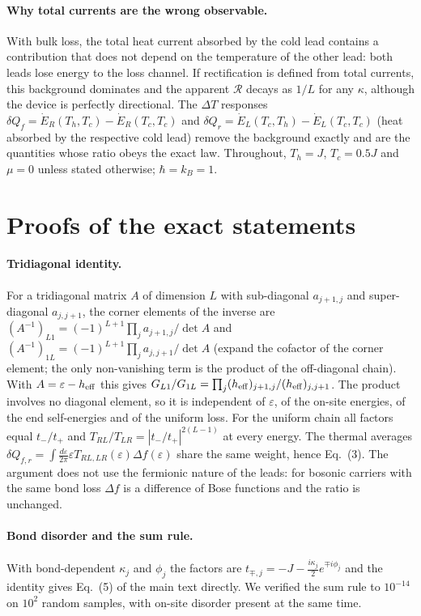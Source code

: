 \documentclass[reprint,aps,prl,superscriptaddress,nofootinbib,floatfix]{revtex4-2}
\newcommand{\R}{\mathcal{R}}
\newcommand{\dQ}{\delta Q}
\newcommand{\heff}{h_{\rm eff}}
\begin{document}
\paragraph{Why total currents are the wrong observable.}
With bulk loss, the total heat current absorbed by the cold lead contains a contribution that does not depend on the temperature of the other lead: both leads lose energy to the loss channel. If rectification is defined from total currents, this background dominates and the apparent $\R$ decays as $1/L$ for any $\kappa$, although the device is perfectly directional. The $\Delta T$ responses $\dQ_{f}=\dot E_R(T_h,T_c)-\dot E_R(T_c,T_c)$ and $\dQ_r=\dot E_L(T_c,T_h)-\dot E_L(T_c,T_c)$ (heat absorbed by the respective cold lead) remove the background exactly and are the quantities whose ratio obeys the exact law. Throughout, $T_h=J$, $T_c=0.5J$ and $\mu=0$ unless stated otherwise; $\hbar=k_B=1$.

\section{Proofs of the exact statements}
\label{sec:proofs}

\paragraph{Tridiagonal identity.}
For a tridiagonal matrix $A$ of dimension $L$ with sub-diagonal $a_{j+1,j}$ and super-diagonal $a_{j,j+1}$, the corner elements of the inverse are $(A^{-1})_{L1}=(-1)^{L+1}\prod_{j}a_{j+1,j}/\det A$ and $(A^{-1})_{1L}=(-1)^{L+1}\prod_j a_{j,j+1}/\det A$ (expand the cofactor of the corner element; the only non-vanishing term is the product of the off-diagonal chain). With $A=\varepsilon-\heff$ this gives $G_{L1}/G_{1L}=\prod_j(\heff)_{j+1,j}/(\heff)_{j,j+1}$. The product involves no diagonal element, so it is independent of $\varepsilon$, of the on-site energies, of the end self-energies and of the uniform loss. For the uniform chain all factors equal $t_-/t_+$ and $T_{RL}/T_{LR}=|t_-/t_+|^{2(L-1)}$ at every energy. The thermal averages $\dQ_{f,r}=\int\frac{d\varepsilon}{2\pi}\varepsilon T_{RL,LR}(\varepsilon)\Delta f(\varepsilon)$ share the same weight, hence Eq.~(3). The argument does not use the fermionic nature of the leads: for bosonic carriers with the same bond loss $\Delta f$ is a difference of Bose functions and the ratio is unchanged.

\paragraph{Bond disorder and the sum rule.}
With bond-dependent $\kappa_j$ and $\phi_j$ the factors are $t_{\mp,j}=-J-\tfrac{i\kappa_j}{2}e^{\mp i\phi_j}$ and the identity gives Eq.~(5) of the main text directly. We verified the sum rule to $10^{-14}$ on $10^2$ random samples, with on-site disorder present at the same time.
\end{document}
